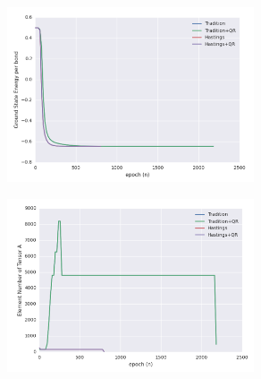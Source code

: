 \begin{figure}[ht]
	\centering
	\includegraphics[width=0.65\textwidth]{figures/fig326.png}
	\caption[Per epoch energy of Heisenberg model on 2d square lattice with fixed truncation error]{}
	\label{fig326}
\end{figure}

\begin{figure}[ht]
	\centering
	\includegraphics[width=0.65\textwidth]{figures/fig327.png}
	\caption[Per epoch energy of Heisenberg model on 2d square lattice with dynamic truncation error]{}
	\label{fig327}
\end{figure}
